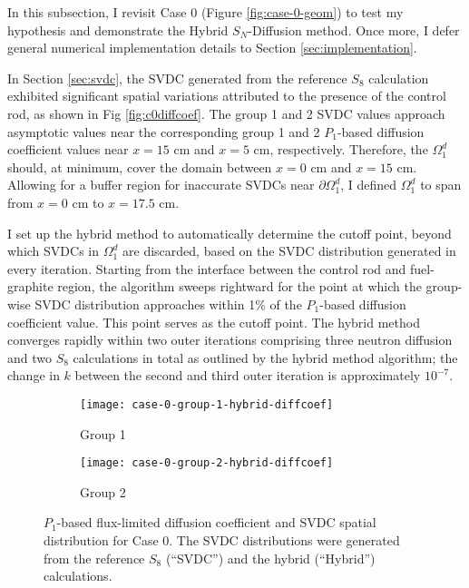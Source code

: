In this subsection, I revisit Case 0
(Figure \ref{fig:case-0-geom}) to test my hypothesis and demonstrate the Hybrid $S_N$-Diffusion
method. Once more, I defer general numerical implementation details to
Section \ref{sec:implementation}.

In Section \ref{sec:svdc}, the \gls{SVDC} generated from the reference $S_8$ calculation exhibited
significant spatial variations attributed to the presence of the control rod, as shown in Fig
\ref{fig:c0diffcoef}. The group 1 and 2 \gls{SVDC} values approach asymptotic values near the
corresponding group 1 and 2 $P_1$-based diffusion coefficient values near $x=15$ cm and $x=5$ cm,
respectively. Therefore, the $\Omega^d_1$ should, at minimum, cover the domain between $x=0$ cm and
$x=15$ cm. Allowing for a buffer region for inaccurate \glspl{SVDC} near $\partial\Omega^d_1$, I
defined $\Omega^d_1$ to span from $x=0$ cm to $x=17.5$ cm.

I set up the hybrid method to automatically determine the cutoff point, beyond which \glspl{SVDC}
in $\Omega^d_1$ are discarded, based on the \gls{SVDC} distribution generated in every iteration.
Starting from the interface between the control rod and fuel-graphite region, the algorithm sweeps
rightward for the point at which the group-wise \gls{SVDC} distribution approaches within 1\% of
the $P_1$-based diffusion coefficient value. This point serves as the cutoff point. The hybrid
method converges rapidly within two outer iterations comprising three neutron diffusion and two
$S_8$ calculations in total as outlined by the hybrid method algorithm; the change in $k$ between
the second and third outer iteration is approximately $10^{-7}$.
%
\begin{figure}[htb!]
  \centering
  \begin{subfigure}[b]{.49\textwidth}
    \centering
    \texttt{[image: case-0-group-1-hybrid-diffcoef]}
    \caption{Group 1}
    \label{fig:c0g1hd}
  \end{subfigure}
  \hfill
  \begin{subfigure}[b]{.49\textwidth}
    \centering
    \texttt{[image: case-0-group-2-hybrid-diffcoef]}
    \caption{Group 2}
    \label{fig:c0g2hd}
  \end{subfigure}
  \caption{$P_1$-based flux-limited diffusion coefficient and \gls{SVDC} spatial distribution for
  Case 0. The \gls{SVDC} distributions were generated from the reference $S_8$ (``SVDC'') and the
  hybrid (``Hybrid'') calculations.}
  \label{fig:c0hd}
\end{figure}

